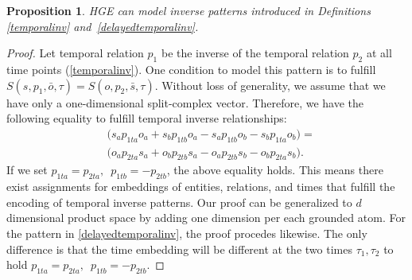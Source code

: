 \documentclass[letterpaper]{article} %
\newtheorem{proposition}{Proposition}
\begin{document}
\begin{proposition}
HGE can model inverse patterns introduced in Definitions \ref{temporalinv} and~\ref{delayedtemporalinv}.
\label{th1:tempinv}
\end{proposition}
\begin{proof}
Let temporal relation $p_1$ be the inverse of the temporal relation $p_2$ at all time points (\ref{temporalinv}).
One condition to model this pattern is to fulfill $S(s,p_1,\bar{o},\tau) =  S(o,p_2,\bar{s},\tau).$
Without loss of generality, we assume that we have only a one-dimensional split-complex vector. 
Therefore, we have the following equality to fulfill temporal inverse relationships:
\begin{equation*}
\begin{split}
    &\big( s_a p_{1ta} o_{a} + s_b p_{1tb} o_{a} - s_a p_{1tb} o_{b} - s_b p_{1ta} o_{b}\big) = \\
    &\big( o_a p_{2ta} s_{a} + o_b p_{2tb} s_{a} - o_a p_{2tb} s_{b} - o_b p_{2ta} s_{b} \big).
\end{split}
\end{equation*}
If we set $p_{1ta}  = p_{2ta},\,\,\, p_{1tb}  = -p_{2tb}$, the above equality holds. This means there exist assignments for embeddings of entities, relations, and times that fulfill the encoding of temporal inverse patterns. 
Our proof can be generalized to $d$ dimensional product space by adding one dimension per each grounded atom. For the pattern in \ref{delayedtemporalinv}, the proof procedes likewise. 
The only difference is that the time embedding will be different at the two times $\tau_1, \tau_2$ to hold $p_{1ta}  = p_{2ta},\,\,\, p_{1tb}  = -p_{2tb}$. 
\end{proof}
\end{document}
